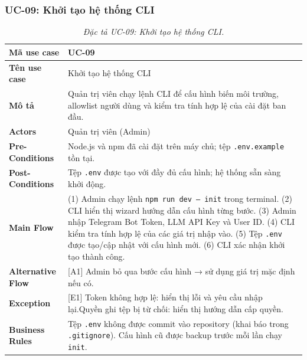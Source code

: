 \subsubsection{UC-09: Khởi tạo hệ thống CLI}
\label{subsec:spec-uc09}
\renewcommand{\arraystretch}{1.4}
\begin{longtable}{|>{\bfseries}p{3.5cm}|p{10.5cm}|}
  \caption{\emph{Đặc tả UC-09: Khởi tạo hệ thống CLI.}} \label{tab:spec-uc09} \\
  \hline
  Mã use case      & UC-09 \\ \hline
  Tên use case     & Khởi tạo hệ thống CLI \\ \hline
  Mô tả            & Quản trị viên chạy lệnh CLI để cấu hình biến môi trường, allowlist người dùng và kiểm tra tính hợp lệ của cài đặt ban đầu. \\ \hline
  Actors           & Quản trị viên (Admin) \\ \hline
  Pre-Conditions   & Node.js và npm đã cài đặt trên máy chủ; tệp \texttt{.env.example} tồn tại. \\ \hline
  Post-Conditions  & Tệp \texttt{.env} được tạo với đầy đủ cấu hình; hệ thống sẵn sàng khởi động. \\ \hline
  Main Flow        & (1) Admin chạy lệnh \texttt{npm run dev -- init} trong terminal.\newline
                     (2) CLI hiển thị wizard hướng dẫn cấu hình từng bước.\newline
                     (3) Admin nhập Telegram Bot Token, LLM API Key và User ID.\newline
                     (4) CLI kiểm tra tính hợp lệ của các giá trị nhập vào.\newline
                     (5) Tệp \texttt{.env} được tạo/cập nhật với cấu hình mới.\newline
                     (6) CLI xác nhận khởi tạo thành công. \\ \hline
  Alternative Flow & [A1] Admin bỏ qua bước cấu hình → sử dụng giá trị mặc định nếu có. \\ \hline
  Exception        & [E1] Token không hợp lệ: hiển thị lỗi và yêu cầu nhập lại.\newline
                     [E2] Quyền ghi tệp bị từ chối: hiển thị hướng dẫn cấp quyền. \\ \hline
  Business Rules   & Tệp \texttt{.env} không được commit vào repository (khai báo trong \texttt{.gitignore}).\newline
                     Cấu hình cũ được backup trước mỗi lần chạy \texttt{init}. \\ \hline
\end{longtable}

